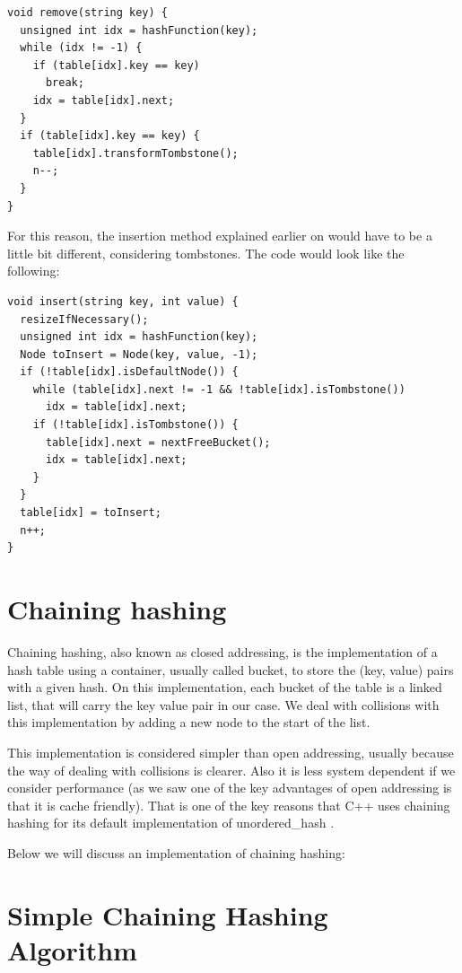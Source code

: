 \begin{lstlisting}
void remove(string key) {
  unsigned int idx = hashFunction(key);
  while (idx != -1) {
    if (table[idx].key == key) 
      break;
    idx = table[idx].next;         
  }
  if (table[idx].key == key) {
    table[idx].transformTombstone();
    n--;
  }
}
\end{lstlisting}

For this reason, the insertion method explained earlier on would have to be a little bit different, considering tombstones. The code would look like the following:

\begin{lstlisting}
void insert(string key, int value) {
  resizeIfNecessary();
  unsigned int idx = hashFunction(key);
  Node toInsert = Node(key, value, -1);
  if (!table[idx].isDefaultNode()) {
    while (table[idx].next != -1 && !table[idx].isTombstone())
      idx = table[idx].next; 
    if (!table[idx].isTombstone()) {
      table[idx].next = nextFreeBucket();
      idx = table[idx].next;
    }
  }
  table[idx] = toInsert;
  n++;
}
\end{lstlisting}

\section{Chaining hashing}

Chaining hashing, also known as closed addressing, is the implementation of a hash table using a container, usually called bucket, to store the (key, value) pairs with a given hash. On this implementation, each bucket of the table is a linked list, that will carry the key value pair in our case. We deal with collisions with this implementation by adding a new node to the start of the list.

This implementation is considered simpler than open addressing, usually because the way of dealing with collisions is clearer. Also it is less system dependent if we consider performance (as we saw one of the key advantages of open addressing is that it is cache friendly). That is one of the key reasons that C++ uses chaining hashing for its default implementation of unordered\_hash \citep{HashTableProposal}.

Below we will discuss an implementation of chaining hashing:

\section{Simple Chaining Hashing Algorithm}

